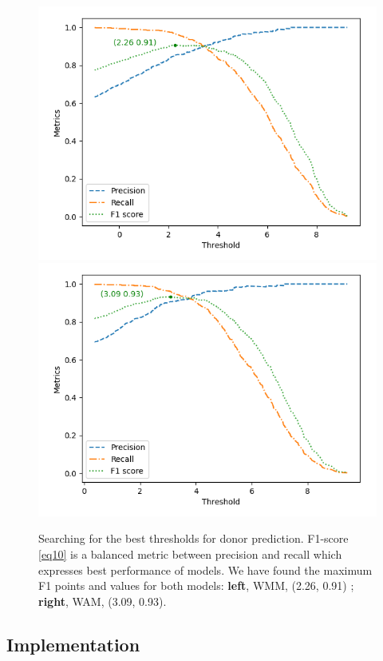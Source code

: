 \documentclass[journal,twoside]{IEEEtran}
\begin{document}
\begin{figure}[htbp]
\centerline{\includegraphics[scale=0.58]{Pics/WMM_threshold_donor.png}
    \includegraphics[scale=0.58]{Pics/WAM_threshold_donor.png}}
\caption{Searching for the best thresholds for donor prediction. F1-score \eqref{eq10} is a balanced metric between precision and recall which expresses best performance of models. We have found the maximum F1 points and values for both models: \textbf{left}, WMM, (2.26, 0.91) ; \textbf{right}, WAM, (3.09, 0.93). }
\label{fig6}
\end{figure}

\subsection{Implementation}\label{3.3}
\end{document}
